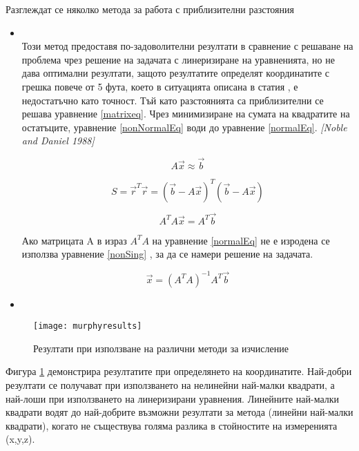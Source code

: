 Разглеждат се няколко метода за работа с приблизителни разстояния

\begin{itemize}
    \item {} \\ Този метод предоставя по-задоволителни резултати в сравнение с решаване на проблема чрез решение на задачата с линеризиране на уравненията, но не дава оптимални резултати, защото резултатите определят координатите с  грешка повече от 5 фута, което в ситуацията описана в статия \cite{murphy}, е недостатъчно като точност. Тъй като разстоянията са приблизителни се решава уравнение \ref{matrixeq}. Чрез минимизиране на сумата на квадратите на остатъците, уравнение \ref{nonNormalEq} води до уравнение \ref{normalEq}. \textit{[Noble and Daniel 1988]}
    
    \begin{equation} \label{matrixeq}
      A \vec{x} \approx \vec{b} 
    \end{equation}
    
    \begin{equation} \label{nonNormalEq}
        S = \vec{r}^T \vec{r} = (\vec{b} - A \vec{x})^T ( \vec{b} - A \vec{x})
    \end{equation}
    
    \begin{equation} \label{normalEq}
        A^T A \vec{x} = A^T \vec{b}
    \end{equation}
    
        
    Ако матрицата A в израз $A^T A$ на уравнение \ref{normalEq} не е изродена се използва уравнение \ref{nonSing} , за да се намери решение на задачата.

    \begin{equation} \label{nonSing}
        \vec{x} = (A^T A)^{-1} A^T \vec{b}
    \end{equation}
    
    \item {}
    
\end{itemize}



\begin{figure}
    \centering
    \texttt{[image: murphyresults]}
    \caption{Резултати при използване на различни методи за изчисление}
    \label{fig:murphyResults}
\end{figure}



Фигура \ref{fig:murphyResults} демонстрира резултатите при определянето на координатите. Най-добри резултати се получават при използването на нелинейни най-малки квадрати, а най-лоши при използването на линеризирани уравнения. Линейните най-малки квадрати водят до най-добрите възможни резултати за метода (линейни най-малки квадрати), когато не съществува голяма разлика в стойностите на измеренията (x,y,z).